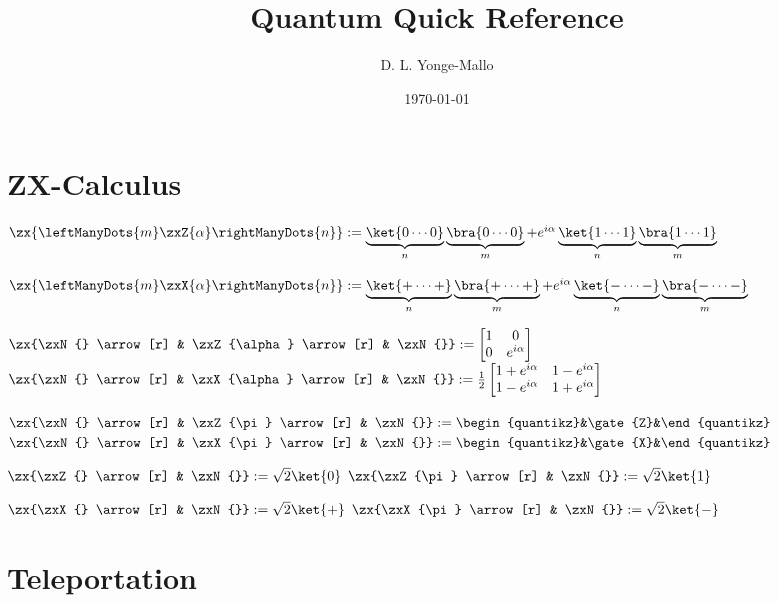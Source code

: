 \documentclass[a4paper,landscape,columns=3]{CheatSheet}
\title{Quantum Quick Reference}
\author{D. L. Yonge-Mallo}
\date{\today}
\begin{document}
\newcommand{\pithalf}{\ensuremath{\frac{\pi t}{2}}}
\newcommand{\ipithalf}{\ensuremath{\frac{i\pi t}{2}}}
\newcommand{\one}{\ensuremath{\mathbbm{1}}}

\maketitle

\section{ZX-Calculus}

$\zx{\leftManyDots{m} \zxZ{\alpha} \rightManyDots{n}} := \underbrace{\ket{0 \cdots 0}}_{n}\underbrace{\bra{0 \cdots 0}}_{m} + e^{i\alpha}\underbrace{\ket{1 \cdots 1}}_{n}\underbrace{\bra{1 \cdots 1}}_{m}$

$\zx{\leftManyDots{m} \zxX{\alpha} \rightManyDots{n}} := \underbrace{\ket{+ \cdots +}}_{n}\underbrace{\bra{+ \cdots +}}_{m} + e^{i\alpha}\underbrace{\ket{- \cdots -}}_{n}\underbrace{\bra{- \cdots -}}_{m}$

$\zx{\zxN{} \arrow[r] & \zxZ{\alpha} \arrow[r] & \zxN{}} :=
\begin{bmatrix}
1 & 0 \\
0 & e^{i\alpha} \\
\end{bmatrix}$
$\zx{\zxN{} \arrow[r] & \zxX{\alpha} \arrow[r] & \zxN{}} :=
\frac{1}{2}
\begin{bmatrix}
1 + e^{i\alpha} & 1 - e^{i\alpha} \\
1 - e^{i\alpha} & 1 + e^{i\alpha} \\
\end{bmatrix}$

$\zx{\zxN{} \arrow[r] & \zxZ{\pi} \arrow[r] & \zxN{}} := \begin{quantikz}&\gate{Z}&\end{quantikz}$
$\zx{\zxN{} \arrow[r] & \zxX{\pi} \arrow[r] & \zxN{}} := \begin{quantikz}&\gate{X}&\end{quantikz}$

$\zx{\zxZ{} \arrow[r] & \zxN{}} := \sqrt{2}\ket{0}$
$\zx{\zxZ{\pi} \arrow[r] & \zxN{}} := \sqrt{2}\ket{1}$

$\zx{\zxX{} \arrow[r] & \zxN{}} := \sqrt{2}\ket{+}$
$\zx{\zxX{\pi} \arrow[r] & \zxN{}} := \sqrt{2}\ket{-}$

\section{Teleportation}
\end{document}
